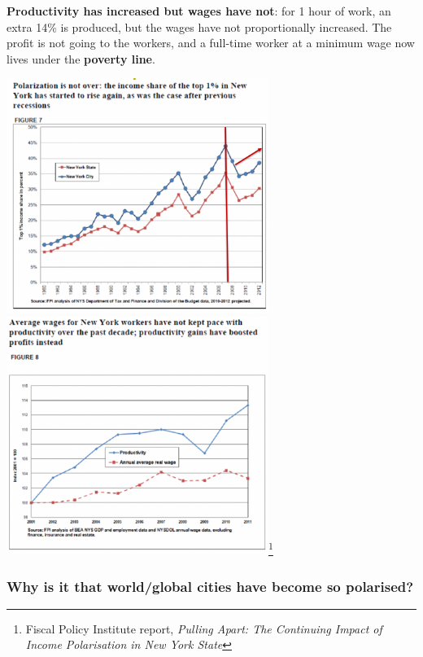 \documentclass{article}
\begin{document}
\textbf{Productivity has increased but wages have not}: for 1 hour of work, an extra 14\% is produced, but the wages have not proportionally increased. The profit is not going to the workers, and a full-time worker at a minimum wage now lives under the \textbf{poverty line}.

\begin{center}
\includegraphics[width=23em]{nyc_income_gap}
\includegraphics[width=23em]{nyc_productivity_gap}\footnote{Fiscal Policy Institute report, \textit{Pulling Apart: The Continuing Impact of Income Polarisation in New York State}}
\end{center}

\subsubsection{Why is it that world/global cities have become so polarised?}
\end{document}
